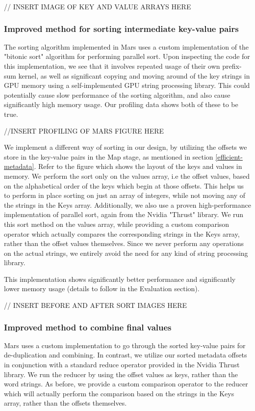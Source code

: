 \documentclass{article}
\begin{document}
// INSERT IMAGE OF KEY AND VALUE ARRAYS HERE

\subsubsection{Improved method for sorting intermediate key-value pairs}
The sorting algorithm implemented in Mars uses a custom implementation of the "bitonic sort" algorithm for performing parallel sort. Upon inspecting the code for this implementation, we see that it involves repeated usage of their own prefix-sum kernel, as well as significant copying and moving around of the key strings in GPU memory using a self-implemented GPU string processing library.  This could potentially cause slow performance of the sorting algorithm, and also cause significantly high memory usage. Our profiling data shows both of these to be true.

//INSERT PROFILING OF MARS FIGURE HERE

We implement a different way of sorting in our design, by utilizing the offsets we store in the key-value pairs in the Map stage, as mentioned in section \ref{efficient-metadata}. Refer to the figure which shows the layout of the keys and values in memory. We perform the sort only on the values array, i.e the offset values, based on the alphabetical order of the keys which begin at those offsets. This helps us to perform in place sorting on just an array of integers, while not moving any of the strings in the Keys array. Additionally, we also use a proven high-performance implementation of parallel sort, again from the Nvidia "Thrust" library.  We run this sort method on the values array, while providing a custom comparison operator which actually compares the corresponding strings in the Keys array, rather than the offset values themselves. Since we never perform any operations on the actual strings, we entirely avoid the need for any kind of string processing library.

This implementation shows significantly better performance and significantly lower memory usage (details to follow in the Evaluation section).

// INSERT BEFORE AND AFTER SORT IMAGES HERE


\subsubsection{Improved method to combine final values}
Mars uses a custom implementation to go through the sorted key-value pairs for de-duplication and combining. In contrast, we utilize our sorted metadata offsets in conjunction with a standard reduce operator provided in the Nvidia Thrust library. We run the reducer by using the offset values as keys, rather than the word strings. As before, we provide a custom comparison operator to the reducer which will actually perform the comparison based on the strings in the Keys array, rather than the offsets themselves.
\end{document}
